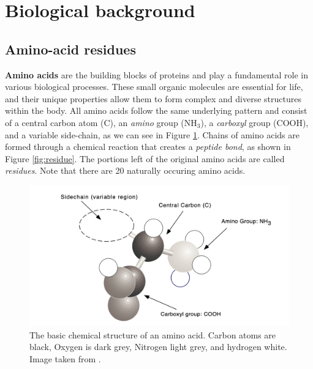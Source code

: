 \section{Biological background}
\subsection{Amino-acid residues}
\textbf{Amino acids} are the building blocks of proteins and play a fundamental role in various biological processes. These small organic molecules are essential for life, and their unique properties allow them to form complex and diverse structures within the body. 
All amino acids follow the same underlying pattern and consist of a central carbon atom (C), an \textit{amino} group ($\text{NH}_3$), a \textit{carboxyl} group (COOH), and a variable side-chain, as we can see in Figure \ref{fig:amino-acid}.
Chains of amino acids are formed through a chemical reaction that creates a \textit{peptide bond}, as shown in Figure \ref{fig:residue}. The portions left of the original amino acids are called \textit{residues}. Note that there are 20 naturally occuring amino acids.
\begin{figure}
    \centering
    \includegraphics[scale=0.5]{figures/amino-acid.png}
    \caption{The basic chemical structure of an amino acid. Carbon atoms are black, Oxygen is dark grey, Nitrogen light grey, and hydrogen white. Image taken from \cite{hunter1993molecular}.}
    \label{fig:amino-acid}
\end{figure}

